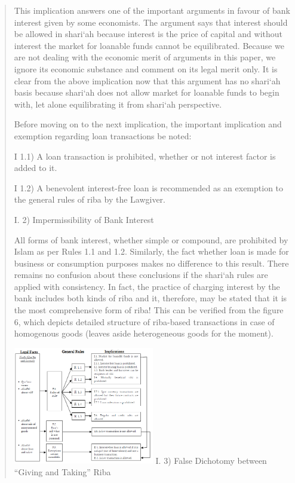 \begin{quote}
This implication answers one of the important arguments in favour of bank interest given by some economists. The argument says that interest should be allowed in shari‘ah because interest is the price of capital and without interest the market for loanable funds cannot be equilibrated. Because we are not dealing with the economic merit of arguments in this paper, we ignore its economic substance and comment on its legal merit only. It is clear from the above implication now that this argument has no shari‘ah basis because shari‘ah does not allow market for loanable funds to begin with, let alone equilibrating it from shari‘ah perspective.

Before moving on to the next implication, the important implication and exemption regarding loan transactions be noted:

I 1.1) A loan transaction is prohibited, whether or not interest factor is added to it.

I 1.2) A benevolent interest-free loan is recommended as an exemption to the general rules of riba by the Lawgiver.

I. 2) Impermissibility of Bank Interest

All forms of bank interest, whether simple or compound, are prohibited by Islam as per Rules 1.1 and 1.2. Similarly, the fact whether loan is made for business or consumption purposes makes no difference to this result. There remains no confusion about these conclusions if the shari‘ah rules are applied with consistency. In fact, the practice of charging interest by the bank includes both kinds of riba and it, therefore, may be stated that it is the most comprehensive form of riba! This can be verified from the figure 6, which depicts detailed structure of riba-based transactions in case of homogenous goods (leaves aside heterogeneous goods for the moment).


\includegraphics[width=0.5\textwidth]{CourantsIslamContemporain/ImagesCourantsIslamContemporain/Ribadistinction.png}
I. 3) False Dichotomy between “Giving and Taking” Riba


\end{quote}
